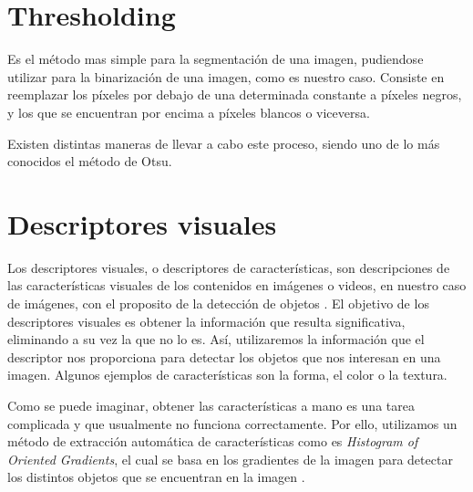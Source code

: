 \section{Thresholding}

Es el método mas simple para la segmentación de una imagen, pudiendose utilizar para la binarización de una imagen, como es nuestro caso. Consiste en reemplazar los píxeles por debajo de una determinada constante a píxeles negros, y los que se encuentran por encima a píxeles blancos o viceversa.

Existen distintas maneras de llevar a cabo este proceso, siendo uno de lo más conocidos el método de Otsu. \cite{wiki:otsu}

\section{Descriptores visuales}

Los descriptores visuales, o descriptores de características, son descripciones de las características visuales de los contenidos en imágenes o videos, en nuestro caso de imágenes, con el proposito de la detección de objetos \cite{wiki:visualdescriptor}. El objetivo de los descriptores visuales es obtener la información que resulta significativa, eliminando a su vez la que no lo es. Así, utilizaremos la información que el descriptor nos proporciona para detectar los objetos que nos interesan en una imagen. Algunos ejemplos de características son la forma, el color o la textura.

Como se puede imaginar, obtener las características a mano es una tarea complicada y que usualmente no funciona correctamente. Por ello, utilizamos un método de extracción automática de características como es \textit{Histogram of Oriented Gradients}, el cual se basa en los gradientes de la imagen para detectar los distintos objetos que se encuentran en la imagen \cite{wiki:hog}.

\begin{comment}
\section{Máquinas de vectores soporte}

Las máquinas de vectores soporte, o SVM, son modelos de aprendizaje supervisados utilizados para tareas de clasificación o de regresión \cite{wiki:svm}. En nuestro caso este modelo se ve usado para tareas de clasificación, puesto que es lo que nos concierne en nuestra problemática.

Para que nuestra SVM sea capaz de clasificar los objetos, le proveemos de un conjunto de entrenamiento compuesto por positivos y negativos, es decir, ejemplos de los objetos que nos interesan y otros objetos, respectivamente. A partir de esta información nuestra SVM será capaz de clasificar nuevos ejemplos en las categorías pertinentes.
\end{comment}

